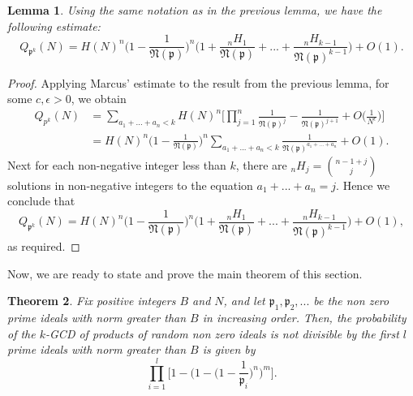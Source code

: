 \documentclass[10pt,a4paper]{article}
\newtheorem{theorem}{Theorem}[section]
\newtheorem{lemma}[theorem]{Lemma}
\theoremstyle{definition}
\theoremstyle{remark}
\newcommand{\f}[1]{\mathfrak{#1}}
\begin{document}
\begin{lemma}
	Using the same notation as in the previous lemma, we have the following estimate:
	$$Q_{\f{p}^k}(N) = H(N)^n\Big(1 - \frac{1}{\f{N}(\f{p})}\Big)^n \Big(1 + \frac{{}_nH_1}{\f{N}(\f{p})} + ... + \frac{{}_nH_{k-1}}{\f{N}(\f{p})^{k-1}}\Big) + O(1).$$
\end{lemma}

\begin{proof}
	Applying Marcus' estimate to the result from the previous lemma, for some $c,\epsilon>0$, we obtain
	\begin{align*} 
		Q_{p^k}(N) &= \sum_{a_1+...+a_n < k} H(N)^n\Big[\prod_{j=1}^n \frac{1}{\f{N}(\f{p})^j}-\frac{1}{\f{N}(\f{p})^{j+1}}+O\bigg(\frac{1}{N^\epsilon}\bigg)\Big]\\ 
		&= H(N)^n\Big(1 - \frac{1}{\f{N}(\f{p})}\Big)^n \sum_{a_1+...+a_n < k} \frac{1}{\f{N}(\f{p})^{a_1 + ... + a_n}} + O(1). 
	\end{align*} 
	\noindent Next for each non-negative integer less than $k$, there are \small${}_nH_j = \binom{n-1+j}{j}\ $ \normalsize  solutions in non-negative integers to the equation $a_1+...+a_n = j$. Hence we conclude that
	$$Q_{\f{p}^k}(N) = H(N)^n\Big(1 - \frac{1}{\f{N}(\f{p})}\Big)^n \Big(1 + \frac{{}_nH_1}{\f{N}(\f{p})} + ... + \frac{{}_nH_{k-1}}{\f{N}(\f{p})^{k-1}}\Big) + O(1),$$
	as required.
\end{proof}

Now, we are ready to state and prove the main theorem of this section.

\begin{theorem}
	Fix positive integers $B$ and $N$, and let $\f{p}_1, \f{p}_2, ...$ be the non zero prime ideals with norm greater than $B$ in increasing order. Then, the probability of the $k$-GCD of products of random non zero ideals is not divisible by the first $l$ prime ideals with norm greater than $B$ is given by 
	$$\prod_{i=1}^{l} \Big[1 - \Big(1 - \Big(1-\frac{1}{\f{p}_i}\Big)^n\Big)^m\Big].$$
\end{theorem}
\end{document}
